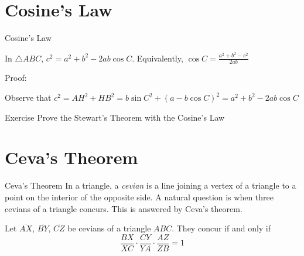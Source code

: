 \documentclass{beamer}
\begin{document}
\section{Cosine's Law}
\begin{frame}{Cosine's Law}
	\begin{theorem}
		In $\triangle ABC$,  $c^2 = a^2 + b^2 - 2ab\cos C$. Equivalently, $\cos C = \frac{a^2+b^2-c^2}{2ab}$
	\end{theorem}
	\pause
	Proof:
	\begin{figure}
		\centering
	\end{figure}
	Observe that $c^2=AH^2+HB^2=b\sin C^2+(a-b\cos C)^2=a^2+b^2-2ab\cos C$
	\pause
	\begin{block}{Exercise}
		Prove the Stewart's Theorem with the Cosine's Law
	\end{block}
\end{frame}

\section{Ceva's Theorem}
\begin{frame}{Ceva's Theorem}
	In a triangle, a \emph{cevian} is a line joining a vertex of a triangle to a point on the interior of the opposite side. A natural question is when three cevians of a triangle concurs. This is answered by Ceva's theorem.
	\begin{theorem}
		Let $\overline{AX}$,  $\overline{BY}$,  $\overline{CZ}$ be cevians of a triangle $ABC$. They concur if and only if
		\begin{equation*}
			\frac{BX}{XC} \cdot \frac{CY}{YA} \cdot \frac{AZ}{ZB} = 1
		\end{equation*}
	\end{theorem}
	\begin{figure}
		\centering
	\end{figure}
\end{frame}
\end{document}
